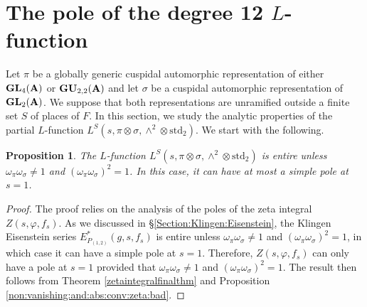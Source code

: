\documentclass[11pt, reqno]{amsart}
\theoremstyle{plain}
\newtheorem{proposition}[theorem]{Proposition}
\theoremstyle{definition}
\theoremstyle{remark}
\theoremstyle{plain}
\def\A{{\bf A}}
\def\GU{{\mathbf{GU}}}
\def\GL{\mathbf{GL}}
\begin{document}
\section{The pole of the degree 12 $L$-function}

Let $\pi$ be a globally generic cuspidal automorphic representation of either $\GL_4(\A)$ or $\GU_{2,2}(\A)$ and let $\sigma$ be a cuspidal automorphic representation of $\GL_2(\A)$. We suppose that both representations are unramified outside a finite set $S$ of places of $F$. In this section, we study the analytic properties of the partial $L$-function $L^S(s,\pi \otimes \sigma, \wedge^2 \otimes  \mathrm{std}_2)$. We start with the following.

\begin{proposition}\label{Proposition:Poles:L}
    The $L$-function $L^S(s,\pi \otimes \sigma, \wedge^2 \otimes  \mathrm{std}_2)$ is entire unless $\omega_{\pi}\omega_{\sigma}\neq 1$ and $(\omega_{\pi}\omega_{\sigma})^2 = 1$. In this case, it can have at most a simple pole at $s = 1$. 
\end{proposition}

\begin{proof}
The proof relies on the analysis of the poles of the zeta integral $Z(s,\varphi,f_s)$. As we discussed in \S\ref{Section:Klingen:Eisenstein}, the Klingen Eisenstein series $E^*_{P_{(1,2)}}(g,s, f_s)$ is entire unless $\omega_{\pi}\omega_{\sigma}\neq 1$ and $(\omega_{\pi}\omega_{\sigma})^2 = 1$, in which case it can have a simple pole at $s=1$. Therefore,  $Z(s,\varphi,f_s)$ can only have a pole at $s = 1$ provided that $\omega_{\pi}\omega_{\sigma}\neq 1$ and $(\omega_{\pi}\omega_{\sigma})^2 = 1$. The result then follows from Theorem \ref{zetaintegralfinalthm} and Proposition \ref{non:vanishing:and:abs:conv:zeta:bad}.
\end{proof}
\end{document}
